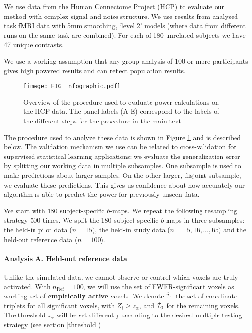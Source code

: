 We use data from the Human Connectome Project (HCP) \citep{VanEssen2012} to evaluate our method with complex signal and noise structure.  We use results from analysed task fMRI data with 5mm smoothing, `level 2' models (where data from different runs on the same task are combined).  For each of 180 unrelated subjects we have 47 unique contrasts.

We use a working assumption that any group analysis of $100$ or more participants gives high powered results and can reflect population results.

\begin{figure}
\begin{center}
\texttt{[image: FIG\_infographic.pdf]}
\end{center}
\caption{Overview of the procedure used to evaluate power calculations on the HCP-data.  The panel labels (A-E) correspond to the labels of the different steps for the procedure in the main text.} \label{infographic}
\end{figure}

The procedure used to analyze these data is shown in Figure \ref{infographic} and is described below. The validation mechanism we use can be related to cross-validation for supervised statistical learning applications: we evaluate the generalization error by splitting our working data in multiple subsamples.  One subsample is used to make predictions about larger samples. On the other larger, disjoint subsample, we evaluate those predictions.  This gives us confidence about how accurately our algorithm is able to predict the power for previously unseen data.

We start with 180 subject-specific $b$-maps.  We repeat the following resampling strategy 500 times.  We split the 180 subject-specific $b$-maps in three subsamples: the held-in pilot data ($n=15$), the held-in study data ($n=15,16, ..., 65$) and the held-out reference data ($n=100$).

\paragraph{Analysis A. Held-out reference data}  Unlike the simulated data, we cannot observe or control which voxels are truly activated.  With $n_{\text{Ref}}=100$, we will use the set of FWER-significant voxels as working set of \textbf{empirically active} voxels.  We denote $\tilde{\cal I}_1$ the set of coordinate triplets for all significant voxels, with $Z_i \geq z_\alpha$, and $\tilde{\cal I}_0$ for the remaining voxels.  The threshold $z_\alpha$ will be set differently according to the desired multiple testing strategy (see section \ref{threshold})

